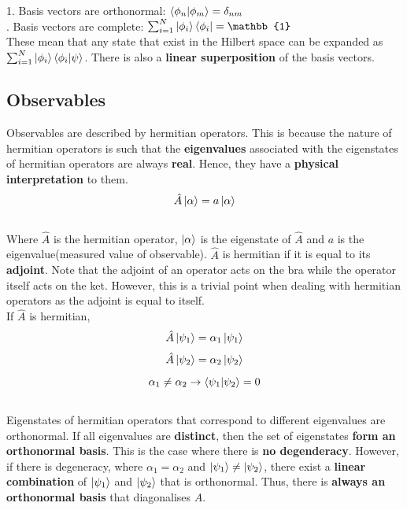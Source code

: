 \documentclass{article}
\begin{document}
\begin{flushleft}
1. Basis vectors are orthonormal: $\bra{\phi_n}\ket{\phi_m}=\delta_{nm}$\\

. Basis vectors are complete: $\sum_{i=1}^{N}\ket{\phi_i}\bra{\phi_i}=\mathbb{1}$\\[0.5cm]

These mean that any state that exist in the Hilbert space can be expanded as $\sum_{i=1}^{N}\ket{\phi_i}\bra{\phi_i}\ket{\psi}$. There is also a \textbf{linear superposition} of the basis vectors.

\subsection{Observables}
Observables are described by hermitian operators. This is because the nature of hermitian operators is such that the \textbf{eigenvalues} associated with the eigenstates of hermitian operators are always \textbf{real}. Hence, they have a \textbf{physical interpretation} to them.\\

$$\hat{A}\ket{\alpha}=a\ket{\alpha}$$\\

Where $\hat{A}$ is the hermitian operator, $\ket{\alpha}$ is the eigenstate of $\hat{A}$ and $a$ is the eigenvalue(measured value of observable). $\hat{A}$ is hermitian if it is equal to its \textbf{adjoint}. Note that the adjoint of an operator acts on the bra while the operator itself acts on the ket. However, this is a trivial point when dealing with hermitian operators as the adjoint is equal to itself.\\[0.5cm]

If $\hat{A}$ is hermitian,
$$\hat{A}\ket{\psi_1}=\alpha_1\ket{\psi_1}$$
$$\hat{A}\ket{\psi_2}=\alpha_2\ket{\psi_2}$$
$$\alpha_1\neq\alpha_2\rightarrow\bra{\psi_1}\ket{\psi_2}=0$$\\

Eigenstates of hermitian operators that correspond to different eigenvalues are orthonormal. If all eigenvalues are \textbf{distinct}, then the set of eigenstates \textbf{form an orthonormal basis}. This is the case where there is \textbf{no degenderacy}. However, if there is degeneracy, where $\alpha_1=\alpha_2$ and $\ket{\psi_1}\neq\ket{\psi_2}$, there exist a \textbf{linear combination} of $\ket{\psi_1}$ and $\ket{\psi_2}$ that is orthonormal. Thus, there is \textbf{always an orthonormal basis} that diagonalises $\hat{A}$.\\[0.5cm]


\end{flushleft}
\end{document}
